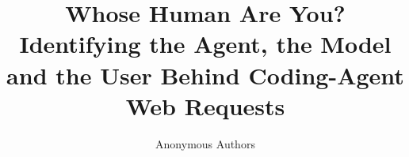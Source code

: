 \documentclass[sigconf,anonymous,review]{acmart}
\begin{document}
\title{Whose Human Are You? Identifying the Agent, the Model and the User Behind Coding-Agent Web Requests}

\author{Anonymous Authors}

\begin{abstract}
\end{abstract}

\maketitle




\end{document}

